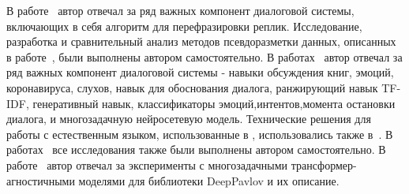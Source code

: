{\contribution} В работе~\cite{Болотин_Карпов_Рашков_Шкурак_2019} автор отвечал за ряд важных компонент диалоговой системы, включающих в себя алгоритм для перефразировки реплик. Исследование, разработка и сравнительный анализ методов псевдоразметки данных, описанных в работе~\cite{pseudolabel}, были выполнены автором самостоятельно. В работах~\cite{dream1,dream1_trudy,dream2} автор отвечал за ряд важных компонент диалоговой системы - навыки обсуждения книг, эмоций, коронавируса, слухов, навык для обоснования диалога, ранжирующий навык TF-IDF, генеративный навык, классификаторы эмоций,интентов,момента остановки диалога, и многозадачную нейросетевую модель. Технические решения для работы с естественным языком, использованные в \cite{dream1,dream1_trudy,dream2}, использовались также в~\cite{Дуплякин_Дмитрий_Ондар_Ушаков_2021}. В работах~\cite{rumtl,enmtl,rutopics} все исследования также были выполнены автором самостоятельно. В работе~\cite{dp_2023} автор отвечал за эксперименты с многозадачными трансформер-агностичными моделями для библиотеки DeepPavlov и их описание.

